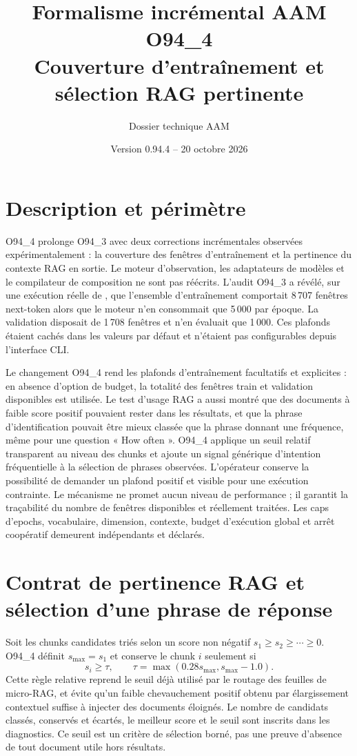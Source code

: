 \documentclass[11pt,a4paper]{article}
\title{Formalisme incrémental AAM O94\_4\\Couverture d'entraînement et sélection RAG pertinente}
\author{Dossier technique AAM}
\date{Version 0.94.4 -- 20 octobre 2026}
\begin{document}
\maketitle
\tableofcontents
\section{Description et périmètre}
O94\_4 prolonge O94\_3 avec deux corrections incrémentales observées expérimentalement : la couverture des fenêtres d'entraînement et la pertinence du contexte RAG en sortie. Le moteur d'observation, les adaptateurs de modèles et le compilateur de composition ne sont pas réécrits. L'audit O94\_3 a révélé, sur une exécution réelle de \texttt{}, que l'ensemble d'entraînement comportait 8\,707 fenêtres next-token alors que le moteur n'en consommait que 5\,000 par époque. La validation disposait de 1\,708 fenêtres et n'en évaluait que 1\,000. Ces plafonds étaient cachés dans les valeurs par défaut et n'étaient pas configurables depuis l'interface CLI.

Le changement O94\_4 rend les plafonds d'entraînement facultatifs et explicites : en absence d'option de budget, la totalité des fenêtres train et validation disponibles est utilisée. Le test d'usage RAG a aussi montré que des documents à faible score positif pouvaient rester dans les résultats, et que la phrase d'identification pouvait être mieux classée que la phrase donnant une fréquence, même pour une question « How often ». O94\_4 applique un seuil relatif transparent au niveau des chunks et ajoute un signal générique d'intention fréquentielle à la sélection de phrases observées. L'opérateur conserve la possibilité de demander un plafond positif et visible pour une exécution contrainte. Le mécanisme ne promet aucun niveau de performance ; il garantit la traçabilité du nombre de fenêtres disponibles et réellement traitées. Les caps d'epochs, vocabulaire, dimension, contexte, budget d'exécution global et arrêt coopératif demeurent indépendants et déclarés.

\section{Contrat de pertinence RAG et sélection d'une phrase de réponse}
Soit les chunks candidates triés selon un score non négatif $s_1\geq s_2\geq\cdots\geq0$. O94\_4 définit $s_{\max}=s_1$ et conserve le chunk $i$ seulement si
\[
 s_i\geq\tau,\qquad \tau=\max(0.28s_{\max},s_{\max}-1.0).
\]
Cette règle relative reprend le seuil déjà utilisé par le routage des feuilles de micro-RAG, et évite qu'un faible chevauchement positif obtenu par élargissement contextuel suffise à injecter des documents éloignés. Le nombre de candidats classés, conservés et écartés, le meilleur score et le seuil sont inscrits dans les diagnostics. Ce seuil est un critère de sélection borné, pas une preuve d'absence de tout document utile hors résultats.
\end{document}
